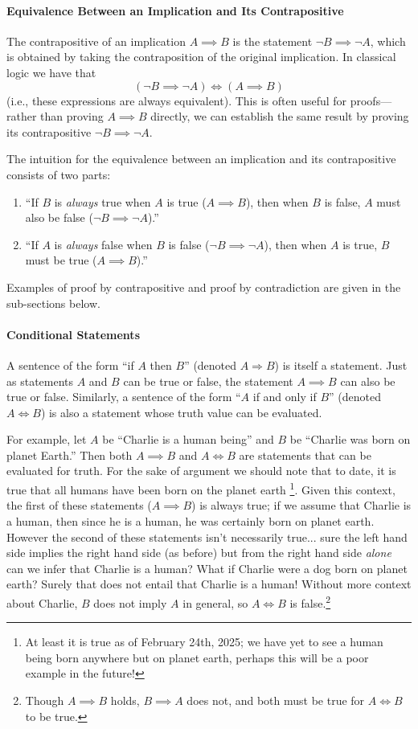 \paragraph{Equivalence Between an Implication and Its Contrapositive}  
The contrapositive of an implication \( A \implies B \) is the statement \( \lnot B \implies \lnot A \), which is obtained by taking the contraposition of the original implication. In classical logic we have that  
\[
    (\lnot B \implies \lnot A) \iff (A\implies B)
\]  
(i.e., these expressions are always equivalent). This is often useful for proofs—rather than proving \( A\implies B \) directly, we can establish the same result by proving its contrapositive \( \lnot B \implies \lnot A \).  

The intuition for the equivalence between an implication and its contrapositive consists of two parts:  
\begin{enumerate}  
    \item ``If \( B \) is \textit{always} true when \( A \) is true (\( A\implies B \)), then when \( B \) is false, \( A \) must also be false (\( \lnot B \implies \lnot A \)).''  
    \item ``If \( A \) is \textit{always} false when \( B \) is false (\( \lnot B \implies \lnot A \)), then when \( A \) is true, \( B \) must be true (\( A\implies B \)).''  
\end{enumerate}  
Examples of proof by contrapositive and proof by contradiction are given in the sub-sections below.  

\paragraph{Conditional Statements}
A sentence of the form ``if $A$ then $B$'' (denoted $A \Rightarrow B$) is itself a statement. Just as statements $A$ and $B$ can be true or false, the statement $A \implies B$ can also be true or false. Similarly, a sentence of the form ``$A$ if and only if $B$'' (denoted $A \iff B$) is also a statement whose truth value can be evaluated. 

For example, let $A$ be ``Charlie is a human being'' and $B$ be ``Charlie was born on planet Earth.'' Then both $A \implies B$ and $A \iff B$ are statements that can be evaluated for truth. 
For the sake of argument we should note that to date, it is true that all humans have been born on the planet earth \footnote{At least it is true as of February 24th, 2025; we have yet to see a human being born anywhere but on planet earth, perhaps this will be a poor example in the future!}. Given this context, the first of these statements ($A\implies B$) is always true; if we assume that Charlie is a human, then since he is a human, he was certainly born on planet earth. However the second of these statements isn't necessarily true... sure the left hand side implies the right hand side (as before) but from the right hand side \textit{alone} can we infer that Charlie is a human? What if Charlie were a dog born on planet earth? Surely that does not entail that Charlie is a human! Without more context about Charlie, $B$ does not imply $A$ in general, so $A \iff B$ is false.\footnote{Though $A\implies B$ holds, $B\implies A$ does not, and both must be true for $A \iff B$ to be true.}


